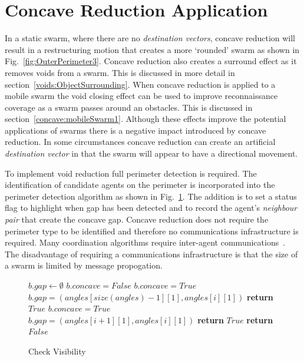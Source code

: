 \documentclass{ieeeaccess}
\begin{document}
\section{Concave Reduction Application}\label{sec:ConcaveReductionApplication}
In a static swarm, where there are no \textit{destination vectors}, concave reduction will result in a restructuring motion that creates a more `rounded' swarm as shown in Fig.~\ref{fig:OuterPerimeter3}. Concave reduction also creates a surround effect as it removes voids from a swarm. This is discussed in more detail in section~\ref{voids:ObjectSurrounding}. When concave reduction is applied to a mobile swarm the void closing effect can be used to improve reconnaissance coverage as a swarm passes around an obstacles. This is discussed in section~\ref{concave:mobileSwarm1}.
Although these effects improve the potential applications of swarms there is a negative impact introduced by concave reduction. In some circumstances concave reduction can create an artificial \textit{destination vector} in that the swarm will appear to have a directional movement. 

To implement void reduction full perimeter detection is required. The identification of candidate agents on the perimeter is incorporated into the perimeter detection algorithm as shown in Fig.~\ref{algo:checkVisibility2}. The addition is to set a status flag to highlight when gap has been detected and to record the agent's \textit{neighbour pair} that create the concave gap. Concave reduction does not require the perimeter type to be identified and therefore no communications infrastructure is required. Many coordination algorithms require inter-agent communications~\cite{MD:09,NIM:09,SOM:12,ZFG:13,JG:13}. The disadvantage of requiring a communications infrastructure is that the size of a swarm is limited by message propogation.

\begin{figure}
\begin{algorithmic}[1]
{}
\State $b.gap \leftarrow \emptyset$
\State $b.concave = False$
\State $b.concave = True$
\State $b.gap = (angles[size(angles)-1][1],angles[i][1])$
\EndIf
   \State\textbf{return} $True$
   \EndIf
\EndIf
{}
\State $b.concave = True$\;
\State $b.gap = (angles[i + 1][1],angles[i][1])$
  \EndIf
  \State\textbf{return} $True$
\EndIf
\EndFor
\State\textbf{return} $False$
\EndProcedure
\end{algorithmic}
\caption{Check Visibility}
\label{algo:checkVisibility2}
\end{figure}
\end{document}
